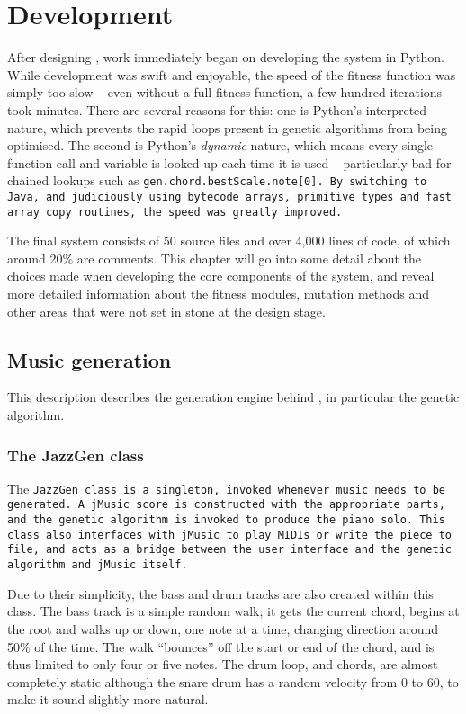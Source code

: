 \chapter{Development}


After designing \jg, work immediately began on developing the system in Python. While development
was swift and enjoyable, the speed of the fitness function was simply too slow -- even without
a full fitness function, a few hundred iterations took minutes. There are several reasons for this:
one is Python's interpreted nature, which prevents the rapid loops present in genetic algorithms
from being optimised. The second is Python's \emph{dynamic} nature, which means every single function
call and variable is looked up each time it is used -- particularly bad for chained lookups such as
\tt{gen.chord.bestScale.note[0]}. By switching to Java, and judiciously using bytecode arrays, primitive
types and fast array copy routines, the speed was greatly improved.

The final system consists of 50 source files and over 4,000 lines of code, of which around 20\% are comments.
This chapter will go into some detail about the choices made when developing the core components of the
system, and reveal more detailed information about the fitness modules, mutation methods and other areas
that were not set in stone at the design stage.

\section{Music generation}

This description describes the generation engine behind \jg, in particular the genetic algorithm.

\subsection{The JazzGen class}

The \tt{JazzGen} class is a singleton, invoked whenever music needs to be generated. A jMusic score is constructed with the appropriate parts, and the genetic algorithm is invoked to produce the piano solo. This class also interfaces with jMusic to play MIDIs or write the piece to file, and acts as a bridge between the user interface and the genetic algorithm and jMusic itself.

Due to their simplicity, the bass and drum tracks are also created within this class. The bass track is a simple random walk; it gets the current chord, begins at the root and walks up or down, one note at a time, changing direction around 50\% of the time. The walk ``bounces'' off the start or end of the chord, and is thus limited to only four or five notes. The drum loop, and chords, are almost completely static although the snare drum has a random velocity from 0 to 60, to make it sound slightly more natural.

